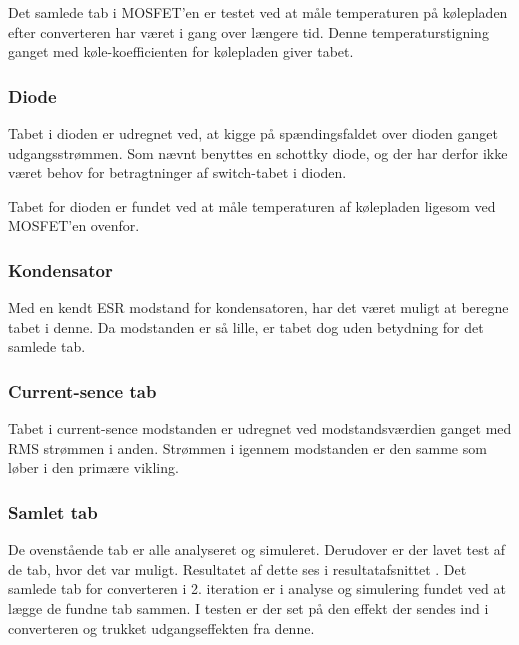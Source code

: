 Det samlede tab i MOSFET'en er testet ved at måle temperaturen på kølepladen efter converteren har været i gang over længere tid. Denne temperaturstigning ganget med køle-koefficienten for kølepladen giver tabet. 

\subsubsection{Diode}
Tabet i dioden er udregnet ved, at kigge på spændingsfaldet over dioden ganget udgangsstrømmen. Som nævnt benyttes en schottky diode, og der har derfor ikke været behov for betragtninger af switch-tabet i dioden. 

Tabet for dioden er fundet ved at måle temperaturen af kølepladen ligesom ved MOSFET'en ovenfor.   

\subsubsection{Kondensator}
Med en kendt ESR modstand for kondensatoren, har det været muligt at beregne tabet i denne. Da modstanden er så lille, er tabet dog uden betydning for det samlede tab.

\subsubsection{Current-sence tab}
Tabet i current-sence modstanden er udregnet ved modstandsværdien ganget med RMS strømmen i anden. Strømmen i igennem modstanden er den samme som løber i den primære vikling. 

\subsubsection{Samlet tab}
De ovenstående tab er alle analyseret og simuleret. Derudover er der lavet test af de tab, hvor det var muligt. Resultatet af dette ses i resultatafsnittet .
Det samlede tab for converteren i 2. iteration er i analyse og simulering fundet ved at lægge de fundne tab sammen. I testen er der set på den effekt der sendes ind i converteren og trukket udgangseffekten fra denne.
